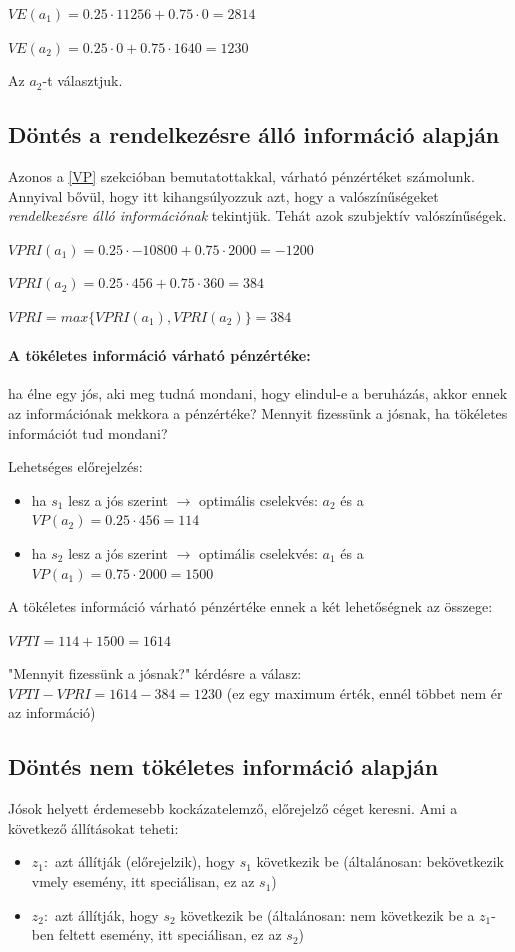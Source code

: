 \documentclass[a4paper,12pt]{article}
\begin{document}
$VE(a_1) = 0.25\cdot 11256 + 0.75\cdot 0 = 2814$

$VE(a_2) = 0.25\cdot 0 + 0.75\cdot 1640 = 1230$

Az $a_2$-t választjuk.

\subsection{Döntés a rendelkezésre álló információ alapján}
Azonos a \ref{VP} szekcióban bemutatottakkal, várható pénzértéket számolunk. Annyival bővül, hogy itt kihangsúlyozzuk azt, hogy a valószínűségeket \emph{rendelkezésre álló információnak} tekintjük. Tehát azok szubjektív valószínűségek.

$VPRI(a_1) = 0.25\cdot -10800 + 0.75\cdot 2000 = -1200$


$VPRI(a_2) = 0.25\cdot 456 + 0.75\cdot 360 = 384$

$VPRI = max\{VPRI(a_1), VPRI(a_2)\} = 384$

\paragraph{A tökéletes információ várható pénzértéke: } ha élne egy jós, aki meg tudná mondani, hogy elindul-e a beruházás, akkor ennek az információnak mekkora a pénzértéke? Mennyit fizessünk a jósnak, ha tökéletes információt tud mondani?

Lehetséges előrejelzés:
\begin{itemize}
\item ha $s_{1}$ lesz a jós szerint $\rightarrow$ optimális cselekvés: $a_2$  és a $VP(a_2) = 0.25\cdot 456 = 114$
\item ha $s_{2}$ lesz a jós szerint $\rightarrow$ optimális cselekvés: $a_1$  és a $VP(a_1) = 0.75\cdot 2000 = 1500$
\end{itemize}

A tökéletes információ várható pénzértéke ennek a két lehetőségnek az összege: 

$VPTI = 114 + 1500 = 1614$

"Mennyit fizessünk a jósnak?" kérdésre a válasz: $VPTI - VPRI = 1614 - 384 = 1230$ (ez egy maximum érték, ennél többet nem ér az információ)

\subsection{Döntés nem tökéletes információ alapján}

Jósok helyett érdemesebb kockázatelemző, előrejelző céget keresni. Ami a következő állításokat teheti:
\begin{itemize}
\item $z_{1}:$ azt állítják (előrejelzik), hogy $s_{1}$ következik be  (általánosan: bekövetkezik vmely esemény, itt speciálisan, ez az $s_{1}$)
\item $z_{2}:$ azt állítják, hogy $s_{2}$ következik be (általánosan: nem következik be a $z_{1}$-ben feltett esemény, itt speciálisan, ez az $s_{2}$)
\end{itemize}
\end{document}
